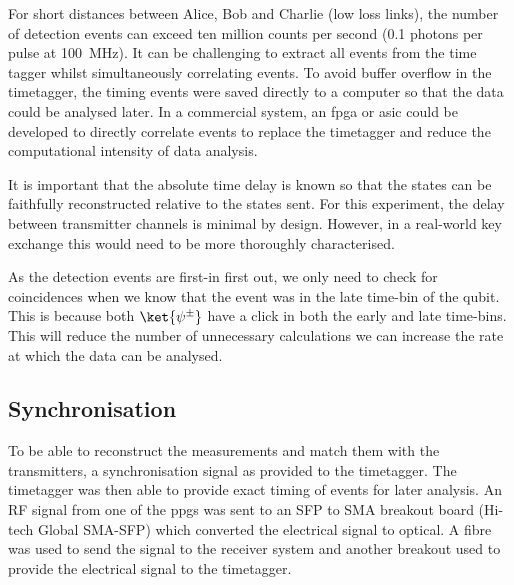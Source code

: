 For short distances between Alice, Bob and Charlie (low loss links), the number of detection events can exceed ten million counts per second (0.1 photons per pulse at \SI{100}{MHz}). It can be challenging to extract all events from the time tagger whilst simultaneously correlating events. To avoid buffer overflow in the timetagger, the timing events were saved directly to a computer so that the data could be analysed later. In a commercial system, an \ac{fpga} or \ac{asic} could be developed to directly correlate events to replace the timetagger and reduce the computational intensity of data analysis. 

It is important that the absolute time delay is known so that the states can be faithfully reconstructed relative to the states sent. For this experiment, the delay between transmitter channels is minimal by design. However, in a real-world key exchange this would need to be more thoroughly characterised. 

As the detection events are first-in first out, we only need to check for coincidences when we know that the event was in the late time-bin of the qubit. This is because both $\ket{\psi^\pm}$ have a click in both the early and late time-bins. This will reduce the number of unnecessary calculations we can increase the rate at which the data can be analysed.

%


\subsection{Synchronisation}

To be able to reconstruct the measurements and match them with the transmitters, a synchronisation signal as provided to the timetagger. The timetagger was then able to provide exact timing of events for later analysis. An RF signal from one of the \acp{ppg} was sent to an SFP to SMA breakout board (Hi-tech Global SMA-SFP) which converted the electrical signal to optical. A fibre was used to send the signal to the receiver system and another breakout used to provide the electrical signal to the timetagger. 

